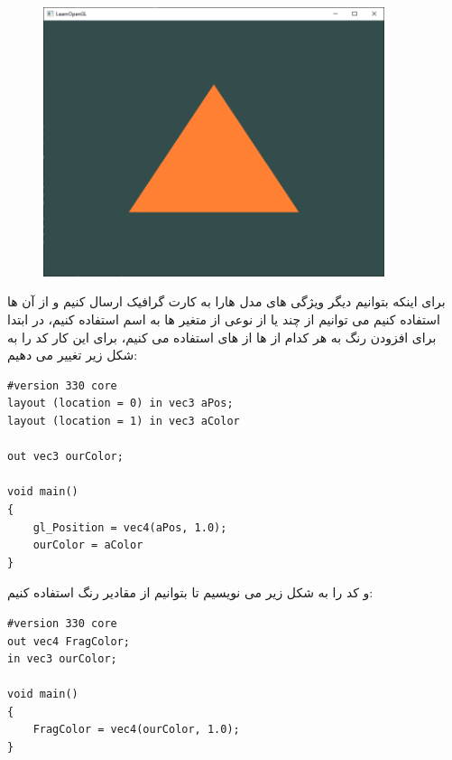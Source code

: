 \documentclass[a4paper, 12pt]{report}
\newcommand{\lrit}[1]{\lr{\textit{#1}}}
\begin{document}
\vspace*{0.3cm}
\begin{figure}[ht]
    \centering
    \href{https://learnopengl.com}{
        \includegraphics[width=10cm]{images/hellotriangle.png}
    }
    \caption{\fontsize{11pt}{1.0cm}\zarbold\textbf{}}
    \label{fig:my_label}
\end{figure}
\vspace*{0.3cm}

\newpage
    برای اینکه بتوانیم دیگر ویژگی های مدل هارا به کارت گرافیک ارسال کنیم و از آن ها استفاده کنیم می توانیم از چند  یا از نوعی از متغیر ها به اسم  استفاده کنیم، در ابتدا برای افزودن رنگ به هر کدام از  ها از  های  استفاده می کنیم، برای این کار کد   را به شکل زیر تغییر می دهیم:

    \begin{LTR}
    \small
        \begin{lstlisting}[style=C++Style,caption=\lrit{declare and use aColor}]
#version 330 core
layout (location = 0) in vec3 aPos;
layout (location = 1) in vec3 aColor

out vec3 ourColor;

void main()
{
    gl_Position = vec4(aPos, 1.0);
    ourColor = aColor
}
        \end{lstlisting}
    \end{LTR}
    \normalsize
    \vspace*{0.3cm}

    و کد  را به شکل زیر می نویسیم تا بتوانیم از مقادیر رنگ استفاده کنیم:
    \begin{LTR}
    \small
        \begin{lstlisting}[style=C++Style,caption=\lrit{render fragment with color from vertex shader}]
#version 330 core
out vec4 FragColor;
in vec3 ourColor;

void main()
{
    FragColor = vec4(ourColor, 1.0);
}
        \end{lstlisting}
    \end{LTR}
    \normalsize
    \vspace*{0.3cm}
\end{document}
